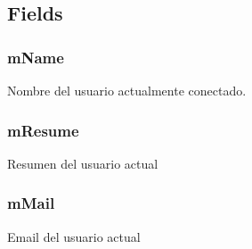 \documentclass[letterpaper,10pt,english]{sphinxmanual}
\begin{document}
\subsection{Fields}
\label{Singletons/InformationHolder:fields}

\subsubsection{mName}
\label{Singletons/InformationHolder:mname}

\begin{fulllineitems}
\label{Singletons/InformationHolder:com.fiuba.tallerii.jobify.InformationHolder.mName}
Nombre del usuario actualmente conectado.

\end{fulllineitems}



\subsubsection{mResume}
\label{Singletons/InformationHolder:mresume}

\begin{fulllineitems}
\label{Singletons/InformationHolder:com.fiuba.tallerii.jobify.InformationHolder.mResume}
Resumen del usuario actual

\end{fulllineitems}



\subsubsection{mMail}
\label{Singletons/InformationHolder:mmail}

\begin{fulllineitems}
\label{Singletons/InformationHolder:com.fiuba.tallerii.jobify.InformationHolder.mMail}
Email del usuario actual

\end{fulllineitems}
\end{document}
